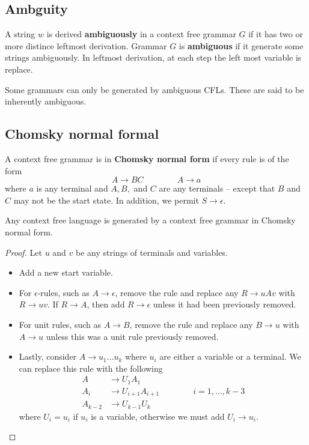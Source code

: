 \subsection{Ambguity}
A string \(w\) is derived \textbf{ambiguously} in a context free grammar \(G\) if it has two or more distince leftmost derivation. Grammar \(G\) is \textbf{ambiguous} if it generate some strings ambiguously. In leftmost derivation, at each step the left most variable is replace.

Some grammars can only be generated by ambiguous CFLs. These are said to be inherently ambiguous. 
\subsection{Chomsky normal formal}
\begin{definition}
    A context free grammar is in \textbf{Chomsky normal form} if every rule is of the form 
    \begin{equation*}
        A \to BC \qquad \qquad A \to a
    \end{equation*}
    where \(a\) is any terminal and \(A,B,\) and \(C\) are any terminals -- except that \(B\) and \(C\) may not be the start state. In addition, we permit \(S \rightarrow \epsilon\).
\end{definition}

\begin{theorem}
    Any context free language is generated by a context free grammar in Chomsky normal form.
\end{theorem}

\begin{proof}
    Let \(u\) and \(v\) be any strings of terminals and variables.
    \begin{itemize}
        \item Add a new start variable.
        \item For \(\epsilon\)-rules, such as \(A \rightarrow \epsilon\), remove the rule and replace any \(R \rightarrow uAv\) with \(R \rightarrow uv\). If \(R \rightarrow A\), then add \(R \rightarrow \epsilon\) unless it had been previously removed. 
        \item For unit rules, such as \(A \rightarrow B\), remove the rule and replace any \(B \rightarrow u\) with \(A \rightarrow u\) unless this was a unit rule previously removed.
        \item Lastly, consider \(A \rightarrow u_1\dots u_k\) where \(u_i\) are either a variable or a terminal. We can replace this rule with the following 
        \begin{align*}
            A &\to U_1 A_1\\
            A_i &\to U_{i+1} A_{i+1}\qquad \qquad i = 1, \dots , k-3\\
            A_{k-2} &\to U_{k-1}U_{k}
        \end{align*} 
        where \(U_i = u_i\) if \(u_i\) is a variable, otherwise we must add \(U_i \rightarrow u_i\).
    \end{itemize}
\end{proof}

